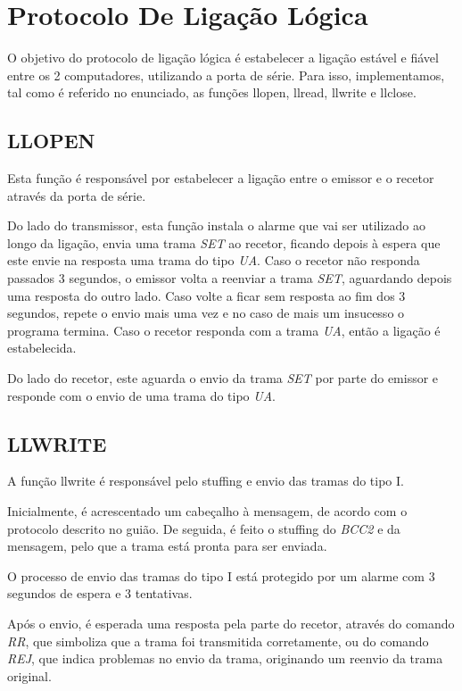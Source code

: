 \documentclass{article}
\begin{document}
\section{Protocolo De Ligação Lógica}

O objetivo do protocolo de ligação lógica é estabelecer a ligação estável e fiável entre os 2 computadores, utilizando a porta de série. Para isso, implementamos, tal como é referido no enunciado, as funções llopen, llread, llwrite e llclose.

\bigskip

\subsection{LLOPEN}

Esta função é responsável por estabelecer a ligação entre o emissor e o recetor através da porta de série.

Do lado do transmissor, esta função instala o alarme que vai ser utilizado ao longo da ligação, envia uma trama \textit{SET} ao recetor, ficando depois à espera que este envie na resposta uma trama do tipo \textit{UA}. Caso o recetor não responda passados 3 segundos, o emissor volta a reenviar a trama \textit{SET}, aguardando depois uma resposta do outro lado. Caso volte a ficar sem resposta ao fim dos 3 segundos, repete o envio mais uma vez e no caso de mais um insucesso o programa termina. Caso o recetor responda com a trama \textit{UA}, então a ligação é estabelecida.

Do lado do recetor, este aguarda o envio da trama \textit{SET} por parte do emissor e responde com o envio de uma trama do tipo \textit{UA}.

\subsection{LLWRITE}

A função llwrite é responsável pelo stuffing e envio das tramas do tipo I.

Inicialmente, é acrescentado um cabeçalho à mensagem, de acordo com o protocolo descrito no guião. De seguida, é feito o stuffing do \textit{BCC2} e da mensagem, pelo que a trama está pronta para ser enviada.

O processo de envio das tramas do tipo I está protegido por um alarme com 3 segundos de espera e 3 tentativas.

Após o envio, é esperada uma resposta pela parte do recetor, através do comando \textit{RR}, que simboliza que a trama foi transmitida corretamente, ou do comando \textit{REJ}, que indica problemas no envio da trama, originando um reenvio da trama original.
\end{document}
